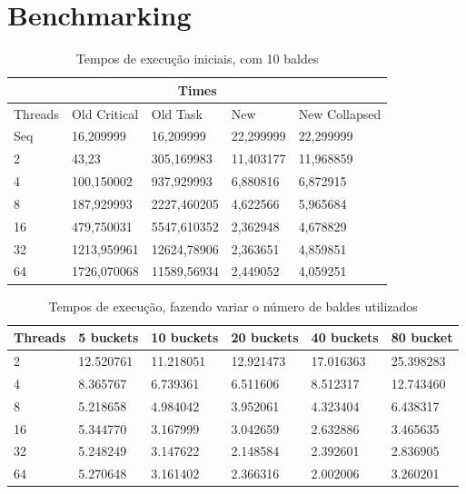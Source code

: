 \documentclass[a4paper]{report}
\begin{document}
\chapter{Benchmarking}
\begin{table}[h]
    \centering
    \begin{tabular}{|l|l|l|l|l|}
        \hline
        \multicolumn{5}{|c|}{Times}                                      \\ \hline
        Threads & Old Critical & Old Task    & New       & New Collapsed \\ \hline
        Seq     & 16,209999    & 16,209999   & 22,299999 & 22,299999     \\ \hline
        2       & 43,23        & 305,169983  & 11,403177 & 11,968859     \\ \hline
        4       & 100,150002   & 937,929993  & 6,880816  & 6,872915      \\ \hline
        8       & 187,929993   & 2227,460205 & 4,622566  & 5,965684      \\ \hline
        16      & 479,750031   & 5547,610352 & 2,362948  & 4,678829      \\ \hline
        32      & 1213,959961  & 12624,78906 & 2,363651  & 4,859851      \\ \hline
        64      & 1726,070068  & 11589,56934 & 2,449052  & 4,059251      \\ \hline
    \end{tabular}
    \caption{\label{tab:Times}Tempos de execução iniciais, com 10 baldes}
\end{table}

\begin{table}[h]
    \centering
    \begin{tabular}{|l|l|l|l|l|l|}
        \hline
        Threads & 5 buckets & 10 buckets & 20 buckets & 40 buckets & 80 bucket \\ \hline
        2       & 12.520761 & 11.218051  & 12.921473  & 17.016363  & 25.398283 \\ \hline
        4       & 8.365767  & 6.739361   & 6.511606   & 8.512317   & 12.743460 \\ \hline
        8       & 5.218658  & 4.984042   & 3.952061   & 4.323404   & 6.438317  \\ \hline
        16      & 5.344770  & 3.167999   & 3.042659   & 2.632886   & 3.465635  \\ \hline
        32      & 5.248249  & 3.147622   & 2.148584   & 2.392601   & 2.836905  \\ \hline
        64      & 5.270648  & 3.161402   & 2.366316   & 2.002006   & 3.260201  \\ \hline
    \end{tabular}
    \caption{\label{tab:fix_size}Tempos de execução, fazendo variar o
    número de baldes utilizados}
\end{table}
\end{document}
